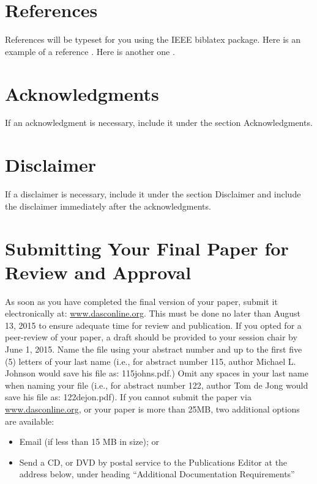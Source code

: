 \documentclass{dasc}
\begin{document}
\section*{References}

References will be typeset for you using the IEEE biblatex package. Here is an example of a reference \cite{Einstein1935}. Here is another one \cite{Nash1950}.

\section*{Acknowledgments}

If an acknowledgment is necessary, include it under the section Acknowledgments.

\section*{Disclaimer}

If a disclaimer is necessary, include it under the section Disclaimer and include the disclaimer immediately after the acknowledgments.

\section*{Submitting Your Final Paper for Review and Approval}

As soon as you have completed the final version of your paper, submit it electronically at: \url{www.dasconline.org}. This must be done no later than August 13, 2015 to ensure adequate time for review and publication.
If you opted for a peer-review of your paper, a draft should be provided to your session chair by June 1, 2015.
Name the file using your abstract number and up to the first five (5) letters of your last name (i.e., for abstract number 115, author Michael L. Johnson would save his file as: 115johns.pdf.) Omit any spaces in your last name when naming your file (i.e., for abstract number 122, author Tom de Jong would save his file as: 122dejon.pdf).
If you cannot submit the paper via \url{www.dasconline.org}, or your paper is more than 25MB, two additional options are available:
\begin{itemize}
	\item Email (if less than 15 MB in size); or
	\item Send a CD, or DVD by postal service to the Publications Editor at the address below, under heading “Additional Documentation Requirements” 
\end{itemize}
\end{document}
